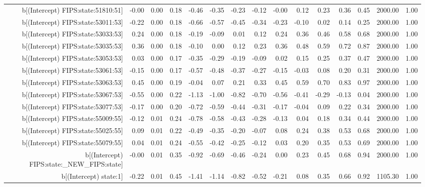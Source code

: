 \begin{table}[ht]
\begin{tabular}{rrrrrrrrrrrrrrr}
  b[(Intercept) FIPS:state:51810:51] & -0.00 & 0.00 & 0.18 & -0.46 & -0.35 & -0.23 & -0.12 & -0.00 & 0.12 & 0.23 & 0.36 & 0.45 & 2000.00 & 1.00 \\ 
  b[(Intercept) FIPS:state:53011:53] & -0.22 & 0.00 & 0.18 & -0.66 & -0.57 & -0.45 & -0.34 & -0.23 & -0.10 & 0.02 & 0.14 & 0.25 & 2000.00 & 1.00 \\ 
  b[(Intercept) FIPS:state:53033:53] & 0.24 & 0.00 & 0.18 & -0.19 & -0.09 & 0.01 & 0.12 & 0.24 & 0.36 & 0.46 & 0.58 & 0.68 & 2000.00 & 1.00 \\ 
  b[(Intercept) FIPS:state:53035:53] & 0.36 & 0.00 & 0.18 & -0.10 & 0.00 & 0.12 & 0.23 & 0.36 & 0.48 & 0.59 & 0.72 & 0.87 & 2000.00 & 1.00 \\ 
  b[(Intercept) FIPS:state:53053:53] & 0.03 & 0.00 & 0.17 & -0.35 & -0.29 & -0.19 & -0.09 & 0.02 & 0.15 & 0.25 & 0.37 & 0.47 & 2000.00 & 1.00 \\ 
  b[(Intercept) FIPS:state:53061:53] & -0.15 & 0.00 & 0.17 & -0.57 & -0.48 & -0.37 & -0.27 & -0.15 & -0.03 & 0.08 & 0.20 & 0.31 & 2000.00 & 1.00 \\ 
  b[(Intercept) FIPS:state:53063:53] & 0.45 & 0.00 & 0.19 & -0.04 & 0.07 & 0.21 & 0.33 & 0.45 & 0.59 & 0.70 & 0.83 & 0.97 & 2000.00 & 1.00 \\ 
  b[(Intercept) FIPS:state:53067:53] & -0.55 & 0.00 & 0.22 & -1.13 & -1.00 & -0.82 & -0.70 & -0.56 & -0.41 & -0.29 & -0.13 & 0.04 & 2000.00 & 1.00 \\ 
  b[(Intercept) FIPS:state:53077:53] & -0.17 & 0.00 & 0.20 & -0.72 & -0.59 & -0.44 & -0.31 & -0.17 & -0.04 & 0.09 & 0.22 & 0.34 & 2000.00 & 1.00 \\ 
  b[(Intercept) FIPS:state:55009:55] & -0.12 & 0.01 & 0.24 & -0.78 & -0.58 & -0.43 & -0.28 & -0.13 & 0.04 & 0.18 & 0.34 & 0.44 & 2000.00 & 1.00 \\ 
  b[(Intercept) FIPS:state:55025:55] & 0.09 & 0.01 & 0.22 & -0.49 & -0.35 & -0.20 & -0.07 & 0.08 & 0.24 & 0.38 & 0.53 & 0.68 & 2000.00 & 1.00 \\ 
  b[(Intercept) FIPS:state:55079:55] & 0.04 & 0.01 & 0.24 & -0.55 & -0.42 & -0.25 & -0.12 & 0.03 & 0.20 & 0.35 & 0.53 & 0.69 & 2000.00 & 1.00 \\ 
  b[(Intercept) FIPS:state:\_NEW\_FIPS:state] & -0.00 & 0.01 & 0.35 & -0.92 & -0.69 & -0.46 & -0.24 & 0.00 & 0.23 & 0.45 & 0.68 & 0.94 & 2000.00 & 1.00 \\ 
  b[(Intercept) state:1] & -0.22 & 0.01 & 0.45 & -1.41 & -1.14 & -0.82 & -0.52 & -0.21 & 0.08 & 0.35 & 0.66 & 0.92 & 1105.30 & 1.00 \\ 

\end{tabular}
\end{table}
